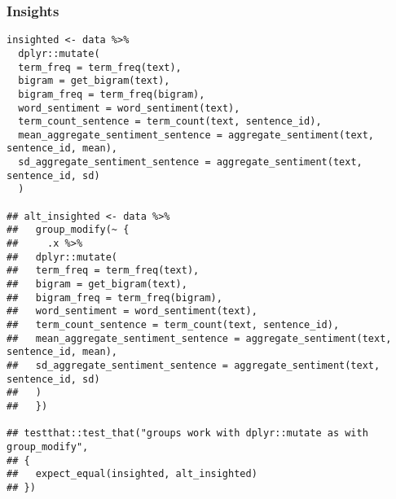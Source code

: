 \documentclass[a4paper, 11pt]{article}
\begin{document}
\subsubsection{Insights}
\label{sec:org59d947f}
\begin{verbatim}
insighted <- data %>%
  dplyr::mutate(
  term_freq = term_freq(text),
  bigram = get_bigram(text),
  bigram_freq = term_freq(bigram),
  word_sentiment = word_sentiment(text),
  term_count_sentence = term_count(text, sentence_id),
  mean_aggregate_sentiment_sentence = aggregate_sentiment(text, sentence_id, mean),
  sd_aggregate_sentiment_sentence = aggregate_sentiment(text, sentence_id, sd)
  )

## alt_insighted <- data %>%
##   group_modify(~ {
##     .x %>%
##   dplyr::mutate(
##   term_freq = term_freq(text),
##   bigram = get_bigram(text),
##   bigram_freq = term_freq(bigram),
##   word_sentiment = word_sentiment(text),
##   term_count_sentence = term_count(text, sentence_id),
##   mean_aggregate_sentiment_sentence = aggregate_sentiment(text, sentence_id, mean),
##   sd_aggregate_sentiment_sentence = aggregate_sentiment(text, sentence_id, sd)
##   )      
##   })

## testthat::test_that("groups work with dplyr::mutate as with group_modify",
## {
##   expect_equal(insighted, alt_insighted)
## })
\end{verbatim}
\end{document}
